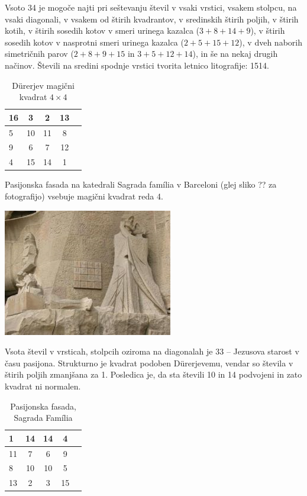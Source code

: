 \documentclass[a4paper,12pt]{article}
\begin{document}
Vsoto 34 je mogoče najti pri seštevanju števil v vsaki vrstici, vsakem stolpcu,
na vsaki diagonali, v vsakem od štirih kvadrantov, v sredinskih štirih poljih,
v štirih kotih, v štirih sosedih kotov v smeri urinega kazalca ($3+8+14+9$), v
štirih sosedih kotov v nasprotni smeri urinega kazalca ($2+5+15+12$), v dveh naborih
simetričnih parov ($2+8+9+15$ in $3+5+12+14$), in še na nekaj drugih načinov.
Števili na sredini spodnje vrstici tvorita letnico litografije: 1514.
%

\begin{table}[hpt]
   \centering
   \normalsize
   \caption{Dürerjev magični kvadrat $4\times 4$}
   \label{table:durer}
   \begin{tabular}{|l|c|c|c|c|}
   \hline
     16 &  3 &  2 & 13 \\\hline
       5 & 10 & 11 &  8 \\\hline
       9 &  6 &  7 & 12 \\\hline
       4 & 15 & 14 &  1 \\\hline
   \end{tabular}
\end{table}

Pasijonska fasada na katedrali Sagrada família v Barceloni
(glej sliko ?? za fotografijo) vsebuje magični kvadrat reda 4.

\includegraphics{sagrada.png}

Vsota števil v vrsticah, stolpcih oziroma na diagonalah je 33 -- Jezusova starost
v času pasijona. Strukturno je kvadrat podoben Dürerjevemu, vendar so števila
v štirih poljih zmanjšana za 1. Posledica je, da sta števili 10 in 14 podvojeni
in zato kvadrat ni normalen.
%
\begin{table}[hpt]
   \centering
   \normalsize
   \caption{Pasijonska fasada, Sagrada Família}
   \label{table:sagrada}
   \begin{tabular}{|l|c|c|c|c|}
      \hline
    1 & 14 & 14 &  4 \\\hline
   11 &  7 &  6 &  9 \\\hline
    8 & 10 & 10 &  5 \\\hline
   13 &  2 &  3 & 15 \\\hline
\end{tabular}
\end{table}
\end{document}
